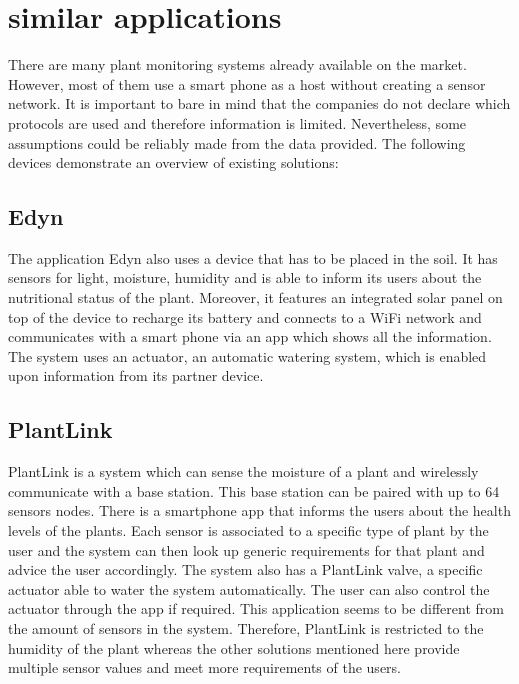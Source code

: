 \section{similar applications}
There are many plant monitoring systems already available on the market. However, most of them use a smart phone as a host without creating a sensor network. It is important to bare in mind that the companies do not declare which protocols are used and therefore information is limited. Nevertheless, some assumptions could be reliably made from the data provided. The following devices demonstrate an overview of existing solutions:\\

\subsection{Edyn}
The application Edyn also uses a device that has to be placed in the soil. It has sensors for light, moisture, humidity and is able to inform its users about the nutritional status of the plant. Moreover, it features an integrated solar panel on top of the device to recharge its battery and connects to a WiFi network and communicates with a smart phone via an app which shows all the information. The system uses an actuator, an automatic watering system, which is enabled upon information from its partner device.\cite{Edyn}\\

\subsection{PlantLink}
PlantLink is a system which can sense the moisture of a plant and wirelessly communicate with a base station. This base station can be paired with up to 64 sensors nodes. There is a smartphone app that informs the users about the health levels of the plants. Each sensor is associated to a specific type of plant by the user and the system can then look up generic requirements for that plant and advice the user accordingly. The system also has a PlantLink valve, a specific actuator able to water the system automatically. The user can also control the actuator through the app if required. This application seems to be different from the amount of sensors in the system.\cite{MyPlantlink} Therefore, PlantLink is restricted to the humidity of the plant whereas the other solutions mentioned here provide multiple sensor values and meet more requirements of the users.\\

